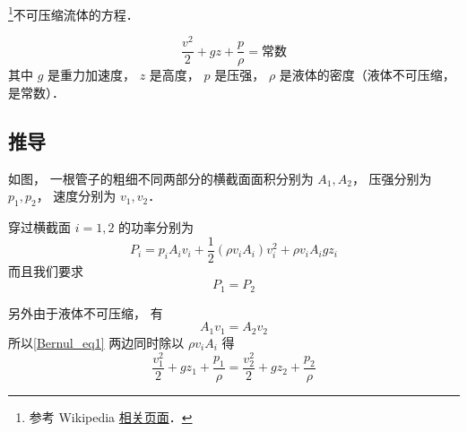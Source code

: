 
\begin{issues}
\issueDraft
\end{issues}

\footnote{参考 Wikipedia \href{https://en.wikipedia.org/wiki/Bernoulli-principle}{相关页面}．}不可压缩流体的方程．

\begin{equation}
\frac{v^2}{2} + gz + \frac{p}{\rho} = \text{常数}
\end{equation}
其中 $g$ 是重力加速度， $z$ 是高度， $p$ 是压强， $\rho$ 是液体的密度（液体不可压缩， 是常数）．

\subsection{推导}
如图， 一根管子的粗细不同两部分的横截面面积分别为 $A_1, A_2$， 压强分别为 $p_1, p_2$， 速度分别为 $v_1, v_2$．

穿过横截面 $i = 1, 2$ 的功率分别为
\begin{equation}
P_i = p_i A_i v_i + \frac{1}{2} (\rho v_i A_i) v_i^2 + \rho v_i A_i g z_i
\end{equation}
而且我们要求
\begin{equation}\label{Bernul_eq1}
P_1 = P_2
\end{equation}

另外由于液体不可压缩， 有
\begin{equation}
A_1v_1 = A_2 v_2
\end{equation}
所以\autoref{Bernul_eq1} 两边同时除以 $\rho v_i A_i$ 得
\begin{equation}
\frac{v_1^2}{2} + gz_1 + \frac{p_1}{\rho} = \frac{v_2^2}{2} + gz_2 + \frac{p_2}{\rho}
\end{equation}

